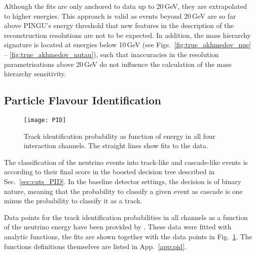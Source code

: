 Although the fits are only anchored to data up to 20\,GeV, they are extrapolated
to higher energies. This approach is valid as events beyond 20\,GeV are so far
above PINGU's energy threshold that new features in the description of the
reconstruction resolutions are not to be expected. In addition, the mass
hierarchy signature is located at energies below 10\,GeV (see
Figs.~\ref{fig:true_akhmedov_nue} -- \ref{fig:true_akhmedov_nutau}), such that
inaccuracies in the resolution parametrisations above 20\,GeV do not influence
the calculation of the mass hierarchy sensitivity.

\subsection{Particle Flavour Identification}
\label{sec:input_pid}

\begin{figure}[htbp]
 \centering
 \texttt{[image: PID]}
 \caption{Track identification probability as function of energy in all four
  interaction channels. The straight lines show fits to the data.}
 \label{fig:PID}
\end{figure}

\noindent
The classification of the neutrino events into track-like and cascade-like
events is according to their final score in the boosted decision tree described
in Sec.~\ref{sec:cuts_PID}. In the baseline detector settings, the decision is
of binary nature, meaning that the probability to classify a given event as
cascade is one minus the probability to classify it as a track.

Data points for the track identification probabilities in all channels as a
function of the neutrino energy have been provided by \cite{JP_PID}. These data
were fitted with analytic functions, the fits are shown together with the data
points in Fig.~\ref{fig:PID}. The functions definitions themselves are listed
in App.~\ref{app:pid}.